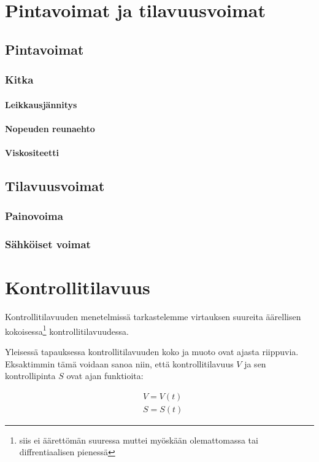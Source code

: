 \documentclass[12pt,a4paper,finnish]{book}
\begin{document}
\chapter{Pintavoimat ja tilavuusvoimat}
\section{Pintavoimat}
\subsection{Kitka}
\subsubsection{Leikkausjännitys}
\subsubsection{Nopeuden reunaehto}
\subsubsection{Viskositeetti}
\section{Tilavuusvoimat}
\subsection{Painovoima}
\subsection{Sähköiset voimat}

\chapter{Kontrollitilavuus}

Kontrollitilavuuden menetelmissä tarkastelemme virtauksen suureita äärellisen kokoisessa\footnote{siis ei 
äärettömän suuressa muttei myöskään olemattomassa tai diffrentiaalisen pienessä} kontrollitilavuudessa.

Yleisessä tapauksessa kontrollitilavuuden koko ja muoto ovat ajasta riippuvia. Eksaktimmin tämä voidaan sanoa niin, 
että kontrollitilavuus $V$ ja sen kontrollipinta $S$ ovat ajan funktioita:

\begin{align}
 &V = V(t)\\
 &S = S(t)
\end{align}
\end{document}

